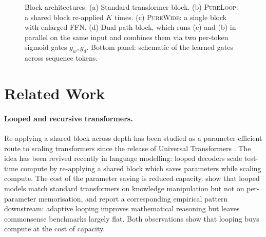 \documentclass[11pt]{article}
\begin{document}
\begin{figure}[t]
\caption{Block architectures. (a) Standard transformer block. (b) \textsc{PureLoop}: a shared block re-applied $K$ times. (c) \textsc{PureWide}: a single block with enlarged FFN. (d) Dual-path block, which runs (c) and (b) in parallel on the same input and combines them via two per-token sigmoid gates $g_w, g_d$. Bottom panel: schematic of the learned gates across sequence tokens.}
\label{fig:architectures}
\end{figure}



\section{Related Work}\label{sec:related}
\paragraph{Looped and recursive transformers.}
Re-applying a shared block across depth has been studied as a parameter-efficient route to scaling transformers since the release of Universal Transformers \citep{dehghani-etal-2019-ut}. The idea has been revived recently in language modelling: looped decoders scale test-time compute by re-applying a shared block \citep{geiping-etal-2025-recurrent, saunshi-etal-2025-looped, zhu2025scaling, jeddi2026loopformer} which saves parameters while scaling compute. The cost of the parameter saving is reduced capacity. \citet{zhu2025scaling} show that looped models match standard transformers on knowledge manipulation but not on per-parameter memorisation, and \citet{frey-etal-2026-adaptive} report a corresponding empirical pattern downstream: adaptive looping improves mathematical reasoning but leaves commonsense benchmarks largely flat. Both observations show that looping buys compute at the cost of capacity.
\end{document}
